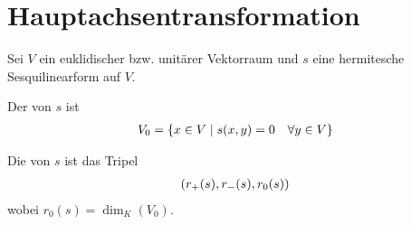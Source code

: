 \section{Hauptachsentransformation}

Sei $V$ ein euklidischer bzw. unitärer Vektorraum und $s$ eine hermitesche Sesquilinearform auf $V$.

\begin{definition}[Ausartungsraum]
	Der  von $s$ ist
	\begin{align}
		V_0=\{x\in V\mid s(x,y)=0\quad\forall y\in V\}\notag
	\end{align}
\end{definition}

\begin{definition}[Signatur]
	Die  von $s$ ist das Tripel
	\begin{align}
		(r_+(s),r_-(s),r_0(s))\notag
	\end{align}
	wobei $r_0(s)=\dim_K(V_0)$.
\end{definition}